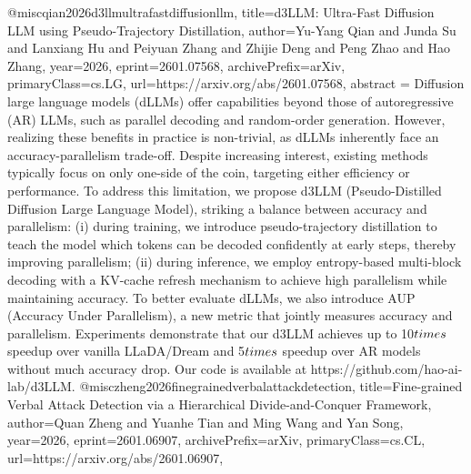 {}@misc{qian2026d3llmultrafastdiffusionllm,
      title={d3LLM: Ultra-Fast Diffusion LLM using Pseudo-Trajectory Distillation}, 
      author={Yu-Yang Qian and Junda Su and Lanxiang Hu and Peiyuan Zhang and Zhijie Deng and Peng Zhao and Hao Zhang},
      year={2026},
      eprint={2601.07568},
      archivePrefix={arXiv},
      primaryClass={cs.LG},
      url={https://arxiv.org/abs/2601.07568},
      abstract = {Diffusion large language models (dLLMs) offer capabilities beyond those of autoregressive (AR) LLMs, such as parallel decoding and random-order generation. However, realizing these benefits in practice is non-trivial, as dLLMs inherently face an accuracy-parallelism trade-off. Despite increasing interest, existing methods typically focus on only one-side of the coin, targeting either efficiency or performance. To address this limitation, we propose d3LLM (Pseudo-Distilled Diffusion Large Language Model), striking a balance between accuracy and parallelism: (i) during training, we introduce pseudo-trajectory distillation to teach the model which tokens can be decoded confidently at early steps, thereby improving parallelism; (ii) during inference, we employ entropy-based multi-block decoding with a KV-cache refresh mechanism to achieve high parallelism while maintaining accuracy. To better evaluate dLLMs, we also introduce AUP (Accuracy Under Parallelism), a new metric that jointly measures accuracy and parallelism. Experiments demonstrate that our d3LLM achieves up to 10$\\times$ speedup over vanilla LLaDA/Dream and 5$\\times$ speedup over AR models without much accuracy drop. Our code is available at https://github.com/hao-ai-lab/d3LLM.}
}@misc{zheng2026finegrainedverbalattackdetection,
      title={Fine-grained Verbal Attack Detection via a Hierarchical Divide-and-Conquer Framework}, 
      author={Quan Zheng and Yuanhe Tian and Ming Wang and Yan Song},
      year={2026},
      eprint={2601.06907},
      archivePrefix={arXiv},
      primaryClass={cs.CL},
      url={https://arxiv.org/abs/2601.06907},
}
